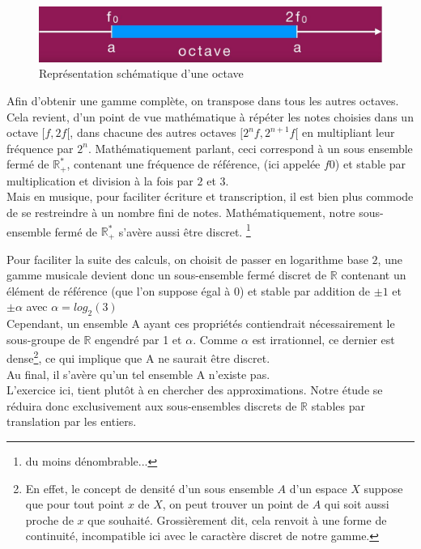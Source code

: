 \documentclass[moyen]{classeUPD}
\begin{document}
\begin{figure}[h!]
	\begin{center}
		\includegraphics[width=0.6\textheight]{Octave}
		\caption{Représentation schématique d'une octave}
		\label{figure 2}
	\end{center}
\end{figure}



Afin d’obtenir une gamme complète, on transpose dans tous les autres octaves. Cela revient, d’un point de vue mathématique à répéter les notes choisies dans un octave $[f,2f[$, dans chacune des autres octaves $[2^{n}f,2^{n+1}f[$ en multipliant leur fréquence par $2^n$.
Mathématiquement parlant, ceci correspond à un sous ensemble fermé de $\mathbb{R}_{+}^{*}$, contenant une fréquence de référence, (ici appelée $f0$) et stable par multiplication et division à la fois par $2$ et $3$.\\
Mais en musique, pour faciliter écriture et transcription, il est bien plus commode de se restreindre à un nombre fini de notes. Mathématiquement, notre sous-ensemble fermé de $\mathbb{R}_{+}^{*}$  s’avère aussi être discret. \footnote{du moins dénombrable... }
\par Pour faciliter la suite des calculs, on choisit de passer en logarithme base $2$, une gamme musicale devient donc un sous-ensemble fermé discret de $\mathbb{R}$ contenant un élément de référence (que l'on suppose égal à 0) et stable par addition de $\pm1$ et $\pm \alpha$ avec $\alpha=log_{2}(3)$\\
Cependant, un ensemble A ayant ces propriétés contiendrait nécessairement le sous-groupe de $\mathbb{R}$ engendré par 1 et $\alpha$. Comme $\alpha$ est irrationnel, ce dernier est dense\footnote{En effet, le concept de densité d'un sous ensemble $A$ d'un espace $X$ suppose que pour tout point $x$ de $X$, on peut trouver un point de $A$ qui soit aussi proche de $x$ que souhaité. Grossièrement dit, cela renvoit à une forme de continuité, incompatible ici avec le caractère discret de notre gamme.}, ce qui implique que A ne saurait être discret.\\

Au final, il s’avère qu'un tel ensemble A n'existe pas.\\
L’exercice ici, tient plutôt à en chercher des approximations. Notre étude se réduira donc exclusivement aux sous-ensembles discrets de $\mathbb{R}$ stables par translation par les entiers.\
\clearpage
\end{document}
